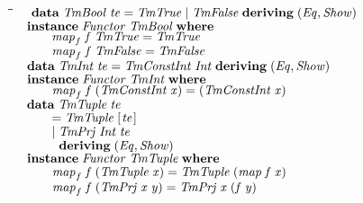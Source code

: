 \documentclass[10pt]{article}
\newlength{\lwidth}\setlength{\lwidth}{4.5cm}
\newlength{\cwidth}\setlength{\cwidth}{8mm} %
\newcommand{\Conid}[1]{\mathit{#1}}
\newcommand{\Varid}[1]{\mathit{#1}}
\begin{document}
\begin{tabbing}
\qquad\=\hspace{\lwidth}\=\hspace{\cwidth}\=\+\kill
${\hskip1.00em\relax\mathbf{data}\;\Conid{TmBool}\;\Varid{te}\mathrel{=}\Conid{TmTrue}\mid \Conid{TmFalse}\;\mathbf{deriving}\;(\Conid{Eq},\Conid{Show})}$\\
${}$\\
${\hskip1.00em\relax\mathbf{instance}\;\Conid{Functor}\;\Conid{TmBool}\;\mathbf{where}}$\\
${\hskip1.00em\relax\hskip2.00em\relax\Varid{map}_{f}\;\Varid{f}\;\Conid{TmTrue}\mathrel{=}\Conid{TmTrue}}$\\
${\hskip1.00em\relax\hskip2.00em\relax\Varid{map}_{f}\;\Varid{f}\;\Conid{TmFalse}\mathrel{=}\Conid{TmFalse}}$\\
${}$\\
${\hskip1.00em\relax\mathbf{data}\;\Conid{TmInt}\;\Varid{te}\mathrel{=}\Conid{TmConstInt}\;\Conid{Int}\;\mathbf{deriving}\;(\Conid{Eq},\Conid{Show})}$\\
${}$\\
${\hskip1.00em\relax\mathbf{instance}\;\Conid{Functor}\;\Conid{TmInt}\;\mathbf{where}}$\\
${\hskip1.00em\relax\hskip2.00em\relax\Varid{map}_{f}\;\Varid{f}\;(\Conid{TmConstInt}\;\Varid{x})\mathrel{=}(\Conid{TmConstInt}\;\Varid{x})}$\\
${}$\\
${\hskip1.00em\relax\mathbf{data}\;\Conid{TmTuple}\;\Varid{te}}$\\
${\hskip1.00em\relax\hskip2.00em\relax\mathrel{=}\Conid{TmTuple}\;[\mskip1.5mu \Varid{te}\mskip1.5mu]}$\\
${\hskip1.00em\relax\hskip2.00em\relax\mid \Conid{TmPrj}\;\Conid{Int}\;\Varid{te}}$\\
${\hskip1.00em\relax\hskip2.00em\relax\phantom{\mid \mbox{}}\mathbf{deriving}\;(\Conid{Eq},\Conid{Show})}$\\
${}$\\
${\hskip1.00em\relax\mathbf{instance}\;\Conid{Functor}\;\Conid{TmTuple}\;\mathbf{where}}$\\
${\hskip1.00em\relax\hskip2.00em\relax\Varid{map}_{f}\;\Varid{f}\;(\Conid{TmTuple}\;\Varid{x})\mathrel{=}\Conid{TmTuple}\;(\Varid{map}\;\Varid{f}\;\Varid{x})}$\\
${\hskip1.00em\relax\hskip2.00em\relax\Varid{map}_{f}\;\Varid{f}\;(\Conid{TmPrj}\;\Varid{x}\;\Varid{y})\mathrel{=}\Conid{TmPrj}\;\Varid{x}\;(\Varid{f}\;\Varid{y})}$\\

\end{tabbing}
\end{document}
